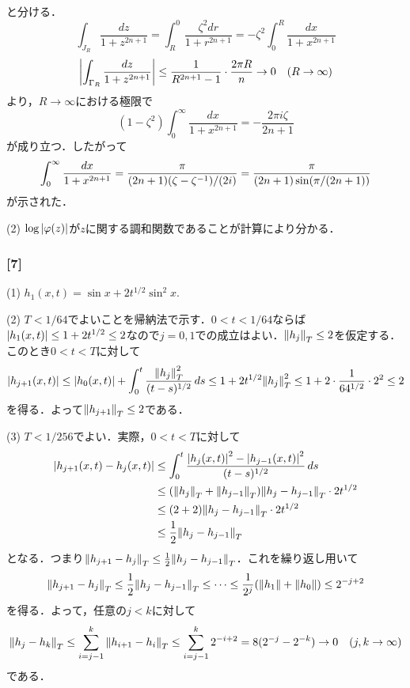 \documentclass[a4j]{ltjsarticle}
\newcommand{\1}{\mathbbm{1}}
\numberwithin{equation}{section}
\theoremstyle{definition}
\begin{document}
と分ける．
\begin{equation}
    \int_{J_R}\frac{dz}{1+z^{2n+1}}=\int_{R}^{0}\frac{\zeta^2dr}{1+r^{2n+1}}=-\zeta^2\int_{0}^{R}\frac{dx}{1+x^{2n+1}}
\end{equation}
\begin{equation}
    \abs{\int_{\Gamma_R}\frac{dz}{1+z^{2n+1}}}\leq \frac{1}{R^{2n+1}-1}\cdot\frac{2\pi R}{n}\to 0\quad (R\to\infty)
\end{equation}
より，$R\to\infty$における極限で
\begin{equation}
    (1-\zeta^2)\int_{0}^{\infty}\frac{dx}{1+x^{2n+1}}=-\frac{2\pi i \zeta}{2n+1}
\end{equation}
が成り立つ．したがって
\begin{equation}
    \int_{0}^{\infty}\frac{dx}{1+x^{2n+1}}=\frac{\pi}{(2n+1)\qty(\zeta-\zeta^{-1})/(2i)}=\frac{\pi}{(2n+1)\sin(\pi/(2n+1))}
\end{equation}
が示された．

(2) $\log\abs{\varphi(z)}$が$z$に関する調和関数であることが計算により分かる．

\subsubsection*{[7]}
(1) $h_1(x,t)=\sin x+2t^{1/2}\sin^2 x$.

(2) $T<1/64$でよいことを帰納法で示す．$0<t<1/64$ならば$\abs{h_1(x,t)}\leq 1+2t^{1/2}\leq 2$なので$j=0,1$での成立はよい．$\norm{h_j}_{T}\leq 2$を仮定する．このとき$0<t<T$に対して
\begin{equation}
    \abs{h_{j+1}(x,t)}\leq \abs{h_0(x,t)}+\int_{0}^{t}\frac{\norm{h_j}_{T}^2}{(t-s)^{1/2}}\,ds\leq 1+2t^{1/2}\norm{h_j}_{T}^2\leq 1+2\cdot \frac{1}{64^{1/2}}\cdot 2^2\leq 2 
\end{equation}
を得る．よって$\norm{h_{j+1}}_{T}\leq 2$である．

(3) $T<1/256$でよい．実際，$0<t<T$に対して
\begin{align}
    \abs{h_{j+1}(x,t)-h_{j}(x,t)}&\leq \int_{0}^{t}\frac{\abs{h_{j}(x,t)}^2-\abs{h_{j-1}(x,t)}^2}{(t-s)^{1/2}}\,ds\\
    &\leq (\norm{h_j}_{T}+\norm{h_{j-1}}_{T})\norm{h_{j}-h_{j-1}}_{T}\cdot 2t^{1/2}\\
    &\leq (2+2)\norm{h_{j}-h_{j-1}}_{T}\cdot 2t^{1/2}\\
    &\leq \frac{1}{2}\norm{h_j-h_{j-1}}_{T}
\end{align}
となる．つまり$\norm{h_{j+1}-h_{j}}_{T}\leq \frac{1}{2}\norm{h_j-h_{j-1}}_{T}$．これを繰り返し用いて
\begin{equation}
    \norm{h_{j+1}-h_{j}}_{T}\leq \frac{1}{2}\norm{h_j-h_{j-1}}_{T}\leq \cdots\leq \frac{1}{2^{j}}(\norm{h_1}+\norm{h_0})\leq 2^{-j+2}
\end{equation}
を得る．よって，任意の$j<k$に対して
\begin{equation}
    \norm{h_j-h_{k}}_{T}\leq \sum_{i=j-1}^{k}\norm{h_{i+1}-h_{i}}_{T}\leq \sum_{i=j-1}^{k}2^{-i+2}=8(2^{-j}-2^{-k})\to0\quad (j,k\to\infty)
\end{equation}
である．
\end{document}
